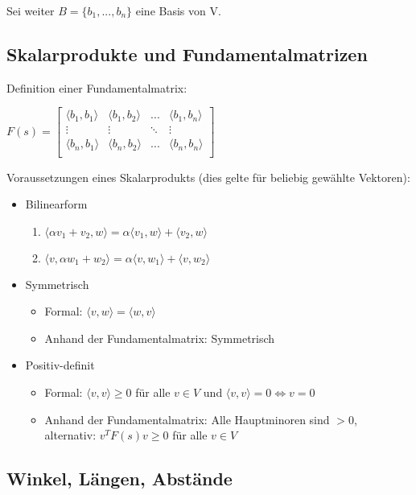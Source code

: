 \documentclass[10pt,a4paper]{article}
\begin{document}
	Sei weiter $B = \{b_1, ..., b_n\}$ eine Basis von V.
	
	\subsection{Skalarprodukte und Fundamentalmatrizen}
		Definition einer Fundamentalmatrix:
		\begin{center}
			$F(s) = \begin{bmatrix}
			\langle b_1, b_1\rangle & \langle b_1, b_2\rangle & ... & \langle b_1, b_n\rangle\\
			\vdots & \vdots & \ddots & \vdots \\
			\langle b_n, b_1\rangle & \langle b_n, b_2\rangle & ... & \langle b_n, b_n\rangle\\			
			\end{bmatrix}$
		\end{center}
		Voraussetzungen eines Skalarprodukts (dies gelte für beliebig gewählte Vektoren):
		\begin{itemize}
			\item Bilinearform
			\begin{enumerate}
				\item $\langle \alpha v_1 + v_2, w\rangle = \alpha\langle  v_1, w\rangle + \langle v_2, w\rangle$
				\item $\langle v, \alpha w_1 + w_2\rangle = \alpha\langle  v, w_1\rangle + \langle v, w_2\rangle$
			\end{enumerate}
			\item Symmetrisch
			\begin{itemize}
				\item Formal: $\langle v, w\rangle = \langle w, v\rangle$
				\item Anhand der Fundamentalmatrix: Symmetrisch
			\end{itemize}
			\item Positiv-definit
			\begin{itemize}
				\item Formal: $\langle v, v\rangle \geq 0$ für alle $v \in V$ und $\langle v, v\rangle = 0 \Leftrightarrow v = 0$
				\item Anhand der Fundamentalmatrix: Alle Hauptminoren sind $> 0$,\\alternativ: $v^TF(s)v \geq 0$ für alle $v \in V$
			\end{itemize}
		\end{itemize}
	
	\subsection{Winkel, Längen, Abstände}
\end{document}
